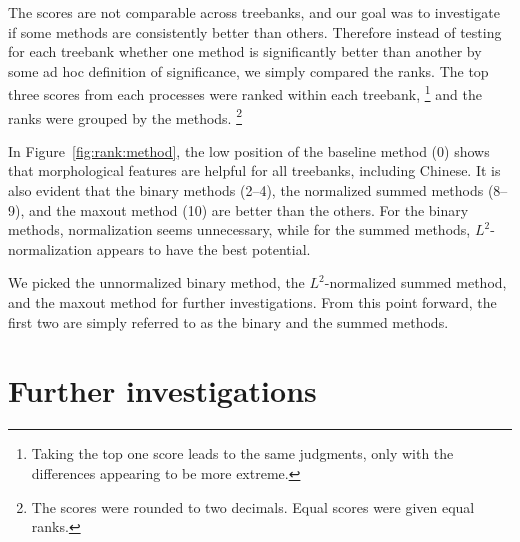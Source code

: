 \documentclass[11pt]{article}
\begin{document}
The scores are not comparable across treebanks,
and our goal was to investigate if some methods are consistently better than others.
Therefore instead of testing for each treebank whether one method is significantly better than another by some ad hoc definition of significance,
we simply compared the ranks.
The top three scores from each processes were ranked within each treebank,%
\footnote{Taking the top one score leads to the same judgments, only with the differences appearing to be more extreme.}
and the ranks were grouped by the methods.%
\footnote{The scores were rounded to two decimals. Equal scores were given equal ranks.}

In Figure~\ref{fig:rank:method},
the low position of the baseline method (0) shows that morphological features are helpful for all treebanks, including Chinese.
It is also evident that the binary methods (2--4), the normalized summed methods (8--9),
and the maxout method (10) are better than the others.
For the binary methods, normalization seems unnecessary,
while for the summed methods, \(L^{2}\)-normalization appears to have the best potential.

We picked the unnormalized binary method, the \(L^{2}\)-normalized summed method, and the maxout method for further investigations.
From this point forward,
the first two are simply referred to as the binary and the summed methods.

\section{Further investigations}
\label{sec:res2}
\end{document}
